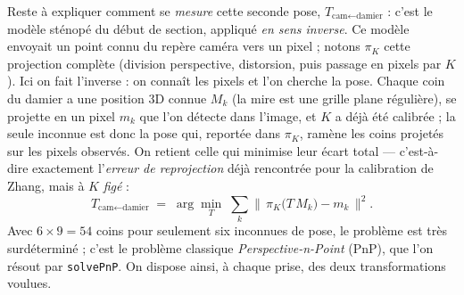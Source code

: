 Reste à expliquer comment se \emph{mesure} cette seconde pose, $T_{\text{cam}\leftarrow\text{damier}}$ : c'est le modèle sténopé du début de section, appliqué \emph{en sens inverse}. Ce modèle envoyait un point connu du repère caméra vers un pixel ; notons $\pi_K$ cette projection complète (division perspective, distorsion, puis passage en pixels par $K$). Ici on fait l'inverse : on connaît les pixels et l'on cherche la pose. Chaque coin du damier a une position 3D connue $M_k$ (la mire est une grille plane régulière), se projette en un pixel $m_k$ que l'on détecte dans l'image, et $K$ a déjà été calibrée ; la seule inconnue est donc la pose qui, reportée dans $\pi_K$, ramène les coins projetés sur les pixels observés. On retient celle qui minimise leur écart total --- c'est-à-dire exactement l'\emph{erreur de reprojection} déjà rencontrée pour la calibration de Zhang, mais à $K$ \emph{figé} :
\[
  T_{\text{cam}\leftarrow\text{damier}} \;=\; \arg\min_{T}\; \sum_k \big\lVert\, \pi_K\!\big(T\,M_k\big) - m_k \,\big\rVert^2 .
\]
Avec $6\times9 = 54$ coins pour seulement six inconnues de pose, le problème est très surdéterminé ; c'est le problème classique \emph{Perspective-n-Point} (PnP), que l'on résout par \texttt{solvePnP}. On dispose ainsi, à chaque prise, des deux transformations voulues.

